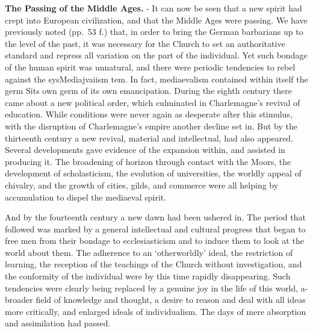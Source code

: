\documentclass[]{book}
\begin{document}
\textbf{The Passing of the Middle Ages.} - It can now be seen that a new spirit had crept into European civilization, and that the Middle Ages were passing. We have previously noted (pp.~53 f.) that, in order to bring the German barbarians up to the level of the past, it was necessary for the Church to set an authoritative standard and repress all variation on the part of the individual. Yet such bondage of the human spirit was unnatural, and there were periodic tendencies to rebel against the sysMediajvaiism tem. In fact, mediaevalism contained within itself the germ Sits own germ of its own emancipation. During the eighth century there came about a new political order, which culminated in Charlemagne's revival of education. While conditions were never again as desperate after this stimulus, with the disruption of Charlemagne's empire another decline set in. But by the thirteenth century a new revival, material and intellectual, had also appeared. Several developments gave evidence of the expansion within, and assisted in producing it. The broadening of horizon through contact with the Moors, the development of scholasticism, the evolution of universities, the worldly appeal of chivalry, and the growth of cities, gilds, and commerce were all helping by accumulation to dispel the mediaeval spirit.

And by the fourteenth century a new dawn had been ushered in. The period that followed was marked by a general intellectual and cultural progress that began to free men from their bondage to ecclesiasticism and to induce them to look at the world about them. The adherence to an `otherworldly' ideal, the restriction of learning, the reception of the teachings of the Church without investigation, and the conformity of the individual were by this time rapidly disappearing. Such tendencies were clearly being replaced by a genuine joy in the life of this world, a- broader field of knowledge and thought, a desire to reason and deal with all ideas more critically, and enlarged ideals of individualism. The days of mere absorption and assimilation had passed.
\end{document}
